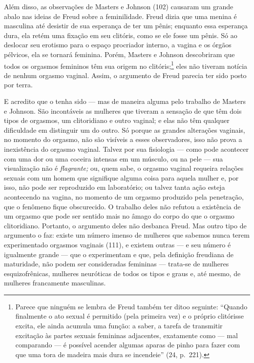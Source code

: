  Além disso, as observações de Masters\idxmaste{} e Johnson\idxjohns{} (102) causaram um
grande abalo nas ideias de Freud sobre a feminilidade. Freud dizia que
uma menina é masculina até desistir de sua esperança de ter um pênis;
enquanto essa esperança dura, ela retém uma fixação em seu clitóris,\idxfeminfixa{}
como se ele fosse um pênis. Só ao deslocar seu erotismo para o espaço
procriador interno, a vagina e os órgãos pélvicos, ela se tornará
feminina. Porém, Masters e Johnson descobriram que todos os orgasmos
femininos têm sua origem no\idxclitfemi{} clitóris;\footnote{ Parece que ninguém se
lembra de Freud também ter dito\idxfreudclito[|nn] o seguinte: ``Quando
finalmente o ato sexual é permitido (pela primeira vez) e o próprio
clitóris\idxclit[|nn] se excita, ele ainda acumula uma função: a saber, a tarefa de
transmitir excitação às partes sexuais femininas adjacentes, exatamente
como --- mal comparando --- é possível acender algumas aparas de
pinho para fazer com que uma tora de madeira mais dura se
incendeie'' (24, p.~221).} eles não tiveram notícia de
nenhum orgasmo\idxvaginorg{} vaginal. Assim, o argumento de Freud parecia ter sido
posto por terra.

 E acredito que o tenha sido --- mas de maneira alguma pelo trabalho de
Masters e Johnson. São incontáveis as mulheres que tiveram a sensação
de que têm dois tipos de orgasmos, um clitoridiano\idxclitorga{} e outro vaginal; e
elas não têm qualquer dificuldade em distinguir um do outro. Só porque
as grandes alterações vaginais, no momento do orgasmo, não são visíveis
a esses observadores, isso não prova a inexistência do orgasmo vaginal.
Talvez por sua fisiologia --- como pode acontecer com uma dor ou uma
coceira intensas em um músculo, ou na pele --- sua visualização não é
\textit{flagrante;} ou, quem sabe, o orgasmo vaginal requeira relações
sexuais com um homem que signifique alguma coisa para aquela mulher e,
por isso, não pode ser reproduzido em laboratório; ou talvez tanta ação
esteja acontecendo na vagina, no momento de um orgasmo produzido pela
penetração, que o fenômeno fique obscurecido. O trabalho deles não
refutou a existência de um orgasmo que pode ser sentido mais no âmago
do corpo do que o orgasmo clitoridiano. Portanto, o argumento deles não
desbanca Freud. Mas outro tipo de argumento o faz: existe um número
imenso de mulheres que sabemos nunca terem experimentado orgasmos
vaginais (111), e existem outras --- e seu número é igualmente grande ---
que o experimentam e que, pela definição freudiana de maturidade, não
podem ser consideradas femininas --- trata-se de mulheres
esquizofrênicas, mulheres neuróticas de todos os tipos e graus e, até
mesmo, de mulheres francamente masculinas.

